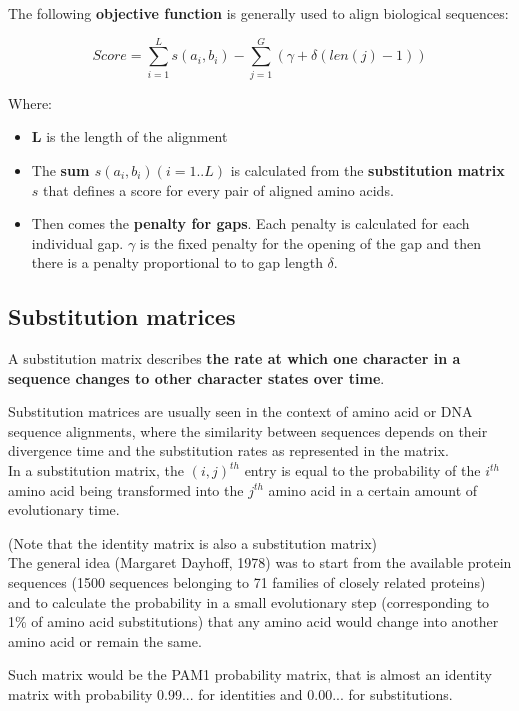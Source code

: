 The following \textbf{objective function} is generally used to align biological
sequences:

\begin{equation}
Score = \sum_{i=1}^{L} s(a_i,b_i) - \sum_{j=1}^{G} (\gamma + \delta(len(j)-1))
\end{equation}

Where:
\begin{itemize}
  \item \textbf{L} is the length of the alignment
  \item The \textbf{sum $s(a_i,b_i) (i=1..L) $} is calculated from the
\textbf{substitution matrix} $s$ that defines a score for every pair of aligned
amino acids.
  \item Then comes the \textbf{penalty for gaps}. Each penalty is calculated
 for each individual gap. \textbf{$\gamma$} is the fixed penalty for the
 opening of the gap and then there is a penalty proportional to to gap length
\textbf{$\delta$}.
\end{itemize}

\subsection{Substitution matrices}

A substitution matrix describes \textbf{the rate at which one character in a
sequence changes to other character states over time}.

Substitution matrices are usually seen in the context of amino acid or DNA
sequence alignments, where the similarity between sequences depends on their
divergence time and the substitution rates as represented in the matrix. \\

In a substitution matrix, the $(i,j)^{th}$ entry is equal to the probability of
the $i^{th}$ amino acid being transformed into the $j^{th}$ amino acid in a
certain amount of evolutionary time.

(Note that the identity matrix is also a substitution matrix) \\

The general idea (Margaret Dayhoff, 1978) was to start from the available
protein sequences (1500 sequences belonging to 71 families of closely related
proteins) and to calculate the probability in a small evolutionary step
(corresponding to 1\% of amino acid substitutions) that any amino acid would
change into another amino acid or remain the same.

Such matrix would be the PAM1 probability matrix, that is almost an identity
matrix with probability 0.99... for identities and 0.00... for substitutions.

